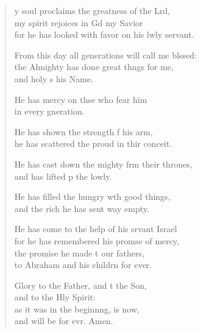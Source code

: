 \begin{verse}
  \begin{patverse}
y soul proclaims the greatness of the Lrd,\Flex\\
my spirit rejoices in Gd my Savior\Med\\
for he has looked with favor on his lwly servant.

From this day all generations will call me blssed:\Flex\\
the Almighty has done great th\pointup{\i}ngs for me,\Med\\
and holy \pointup{\i}s his Name.

He has mercy on thse who fear him\Med\\
in every gneration.

He has shown the strength f his arm,\Med\\
he has scattered the proud in thir conceit.

He has cast down the mighty frm their thrones,\Med\\
and has lifted p the lowly.

He has filled the hungry w\pointup{\i}th good things,\Med\\
and the rich he has sent way empty.

He has come to the help of his srvant Israel\Med\\
for he has remembered his prom\pointup{\i}se of mercy,\\
the promise he made t our fathers,\Med\\
to Abraham and his childrn for ever.

Glory to the Father, and t the Son,\Med\\
and to the Hly Spirit:\\
as it was in the beginn\pointup{\i}ng, is now,\Med\\
and will be for evr. Amen.
  \end{patverse}
\end{verse}
